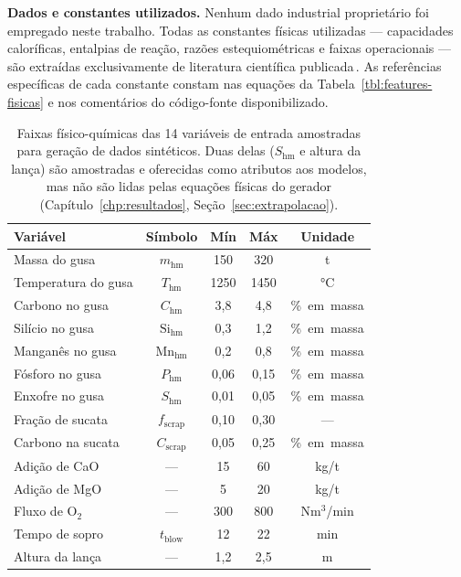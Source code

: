 \textbf{Dados e constantes utilizados.} Nenhum dado industrial proprietário foi empregado neste trabalho. Todas as constantes físicas utilizadas --- capacidades caloríficas, entalpias de reação, razões estequiométricas e faixas operacionais --- são extraídas exclusivamente de literatura científica publicada\,\cite{cai2021heat,bae2020bof,chattopadhyay2022hybrid,xia2024dmpinn}. As referências específicas de cada constante constam nas equações da Tabela~\ref{tbl:features-fisicas} e nos comentários do código-fonte disponibilizado.

\begin{table}[H]
\centering
\caption{Faixas físico-químicas das 14 variáveis de entrada amostradas para geração de dados sintéticos. Duas delas ($S_\text{hm}$ e altura da lança) são amostradas e oferecidas como atributos aos modelos, mas não são lidas pelas equações físicas do gerador (Capítulo~\ref{chp:resultados}, Seção~\ref{sec:extrapolacao}).}
\label{tbl:ranges-sinteticos}
\small
\begin{tabular}{|p{4.2cm}|c|c|c|c|}
\hline
\textbf{Variável} & \textbf{Símbolo} & \textbf{Mín} & \textbf{Máx} & \textbf{Unidade} \\ \hline
Massa do gusa & $m_\text{hm}$ & 150 & 320 & t \\ \hline
Temperatura do gusa & $T_\text{hm}$ & 1250 & 1450 & °C \\ \hline
Carbono no gusa & $C_\text{hm}$ & 3{,}8 & 4{,}8 & \%~em~massa \\ \hline
Silício no gusa & $\text{Si}_\text{hm}$ & 0{,}3 & 1{,}2 & \%~em~massa \\ \hline
Manganês no gusa & $\text{Mn}_\text{hm}$ & 0{,}2 & 0{,}8 & \%~em~massa \\ \hline
Fósforo no gusa & $P_\text{hm}$ & 0{,}06 & 0{,}15 & \%~em~massa \\ \hline
Enxofre no gusa & $S_\text{hm}$ & 0{,}01 & 0{,}05 & \%~em~massa \\ \hline
Fração de sucata & $f_\text{scrap}$ & 0{,}10 & 0{,}30 & — \\ \hline
Carbono na sucata & $C_\text{scrap}$ & 0{,}05 & 0{,}25 & \%~em~massa \\ \hline
Adição de CaO & — & 15 & 60 & kg/t \\ \hline
Adição de MgO & — & 5 & 20 & kg/t \\ \hline
Fluxo de O$_2$ & — & 300 & 800 & Nm$^3$/min \\ \hline
Tempo de sopro & $t_\text{blow}$ & 12 & 22 & min \\ \hline
Altura da lança & — & 1{,}2 & 2{,}5 & m \\ \hline
\end{tabular}
\end{table}

